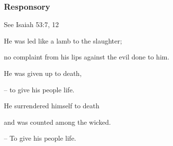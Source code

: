\subsubsection{Responsory}
\hfill See Isaiah 53:7, 12

He was led like a lamb to the slaughter;\par
no complaint from his lips against the evil done to him.\par
He was given up to death,\par
– to give his people life.\par
\vspace{5pt}
He surrendered himself to death\par
and was counted among the wicked.\par
– To give his people life.